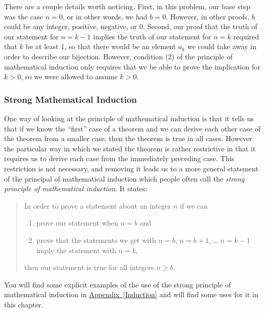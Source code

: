 \documentclass[10pt,]{book}
\theoremstyle{plain}
\theoremstyle{definition}
\numberwithin{equation}{chapter}
\begin{document}
\par
There are a couple details worth noticing. First, in this problem, our base step was the case \(n=0\), or in other words, we had \(b=0\). However, in other proofs, \(b\) could be any integer, positive, negative, or 0. Second, our proof that the truth of our statement for \(n=k-1\) implies the truth of our statement for \(n=k\) required that \(k\) be at least 1, so that there would be an element \(a_k\) we could take away in order to describe our bijection. However, condition (2) of the principle of mathematical induction only requires that we be able to prove the implication for \(k>0\), so we were allowed to assume \(k>0\).%
\typeout{************************************************}
\typeout{************************************************}
\subsubsection[{Strong Mathematical Induction}]{Strong Mathematical Induction}\label{subsubsection-1}
One way of looking at the principle of mathematical induction is that it tells us that if we know the ``first'' case of a theorem and we can derive each other case of the theorem from a smaller case, then the theorem is true in all cases. However the particular way in which we stated the theorem is rather restrictive in that it requires us to derive each case from the immediately preceding case. This restriction is not necessary, and removing it leads us to a more general statement of the principal of mathematical induction which people often call the \emph{strong principle of mathematical induction}. It states:%
\begin{quote}In order to prove a statement about an integer \(n\) if we can \leavevmode%
\begin{enumerate}
\item\hypertarget{li-23}{}prove our statement when \(n=b\) and%
\item\hypertarget{li-24}{}prove that the statements we get with \(n=b\), \(n=b+1\), \dots{} \(n=k-1\) imply the statement with \(n=k\),%
\end{enumerate}
 then our statement is true for all integers \(n\ge b\).\end{quote}
You will find some explicit examples of the use of the strong principle of mathematical induction in \hyperref[Induction]{Appendix~\ref{Induction}} and will find some uses for it in this chapter.%
\typeout{************************************************}
\typeout{************************************************}
\end{document}
